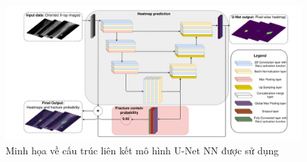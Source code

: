 \documentclass[../the.tex]{subfiles}
\begin{document}
\begin{figure}[H]
\centering
	\includegraphics[width=1\textwidth]{images/unet.PNG}
	\caption{Minh họa về cấu trúc liên kết mô hình U-Net NN được sử dụng \cite{Lindsey1806905115}}
	\label{fig:unet}
\end{figure}
\end{document}
